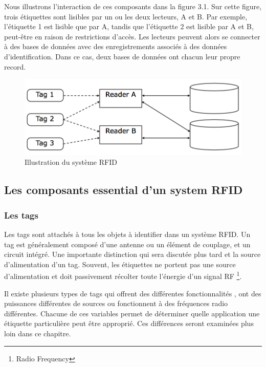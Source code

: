 \documentclass[11pt, a4paper, twoside]{book}
\begin{document}
Nous illustrons l'interaction de ces composants dans la figure 3.1. Sur cette figure, trois étiquettes sont lisibles par un ou les deux lecteurs, A et B. Par exemple, l'étiquette 1 est lisible que par A, tandis que l'étiquette 2 est lisible par A et B, peut-être en raison de restrictions d'accès. Les lecteurs peuvent alors se connecter à des bases de données avec des enregistrements associés à des données d'identification. Dans ce cas, deux bases de données ont chacun leur propre record.\\
\begin{figure}[H]
\centering
\includegraphics[width=\textwidth]{shema}
\caption{Illustration du système RFID}
\end{figure}
\subsection{Les composants essential d'un system RFID}
\subsubsection{Les tags}
Les tags sont attachés à tous les objets à identifier dans un système RFID. Un tag est généralement
composé d'une antenne ou un élément de couplage, et un circuit intégré. Une importante
distinction qui sera discutée plus tard et la source d'alimentation d'un tag. Souvent, les étiquettes ne portent pas une source d'alimentation et doit passivement récolter toute l'énergie d'un signal RF \footnote{Radio Frequency}.

Il existe plusieurs types de tags qui offrent des différentes fonctionnalités , ont des puissances différentes
de sources ou fonctionnent à des fréquences radio différentes. Chacune de ces variables permet de déterminer
quelle application une étiquette particulière peut être approprié. Ces différences seront examinées plus loin dans ce chapitre.
\end{document}
